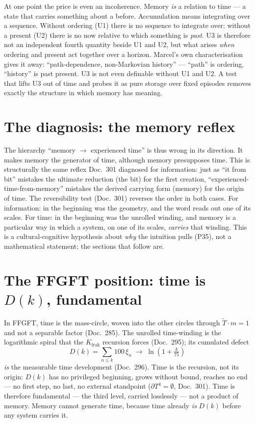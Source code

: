 At one point the price is even an incoherence. Memory \emph{is} a relation to time --- a
state that carries something about a before. Accumulation means integrating over a
sequence. Without ordering (U1) there is no sequence to integrate over; without a present
(U2) there is no now relative to which something is \emph{past}. U3 is therefore not an
independent fourth quantity beside U1 and U2, but what arises \emph{when} ordering and
present act together over a horizon. Marcel's own characterisation gives it away:
\enquote{path-dependence, non-Markovian history} --- \enquote{path} is ordering,
\enquote{history} is past present. U3 is not even definable without U1 and U2. A test that
lifts U3 out of time and probes it as pure storage over fixed episodes removes exactly the
structure in which memory has meaning.

\section{The diagnosis: the memory reflex}

The hierarchy \enquote{memory $\to$ experienced time} is thus wrong in its direction. It
makes memory the generator of time, although memory presupposes time. This is structurally
the same reflex Doc.~301 diagnosed for information: just as \enquote{it from bit} mistakes
the ultimate reduction (the bit) for the first creation, \enquote{experienced-time-from-memory}
mistakes the derived carrying form (memory) for the origin of time. The reversibility test
(Doc.~301) reverses the order in both cases. For information: in the beginning was the
geometry, and the word reads out one of its scales. For time: in the beginning was the
unrolled winding, and memory is a particular way in which a system, on one of its scales,
\emph{carries} that winding. This is a cultural-cognitive hypothesis about \emph{why} the
intuition pulls (P35), not a mathematical statement; the sections that follow are.

\section{The FFGFT position: time is $D(k)$, fundamental}

In FFGFT, time is the mass-circle, woven into the other circles through
$\tilde{T}\cdot m = 1$ and not a separable factor (Doc.~285). The unrolled time-winding is
the logarithmic spiral that the $K_{\text{frak}}$ recursion forces (Doc.~295); its cumulated
defect
\begin{equation}
D(k) = \sum_{n\le k} 100\,\xi_n \;\to\; \ln\!\left(1 + \tfrac{k}{75}\right)
\end{equation}
\emph{is} the measurable time development (Doc.~296). Time is the recursion, not its origin:
$D(k)$ has no privileged beginning, grows without bound, reaches no end --- no first step, no
last, no external standpoint ($\partial T^4 = \emptyset$, Doc.~301). Time is therefore
fundamental --- the third level, carried losslessly --- not a product of memory. Memory
cannot generate time, because time already \emph{is} $D(k)$ before any system carries it.

